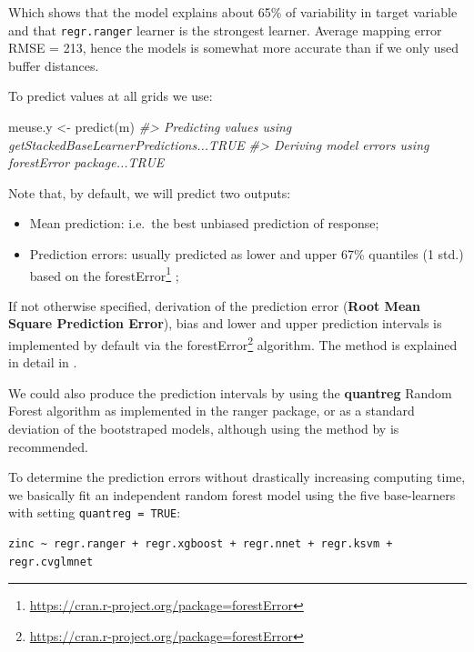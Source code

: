 \documentclass[
  graybox,natbib,nospthms]{svmono}
\newenvironment{Shaded}{\begin{snugshade}}{\end{snugshade}}
\newcommand{\CommentTok}[1]{\textcolor[rgb]{0.37,0.37,0.37}{\textit{#1}}}
\newcommand{\FunctionTok}[1]{\textcolor[rgb]{0,0,0}{#1}}
\newcommand{\NormalTok}[1]{#1}
\newcommand{\OtherTok}[1]{\textcolor[rgb]{0.37,0.37,0.37}{#1}}
\providecommand{\tightlist}{%
  \setlength{\itemsep}{0pt}\setlength{\parskip}{0pt}}
\providecommand{\tightlist}{\setlength{\itemsep}{0pt}\setlength{\parskip}{0pt}}
\renewcommand{\href}[2]{#2 (\url{#1})}
\renewcommand{\href}[2]{#2\footnote{\url{#1}}}
\begin{document}
Which shows that the model explains about 65\% of variability in target variable
and that \texttt{regr.ranger} learner \citep{wright2017ranger} is the strongest learner. Average
mapping error RMSE = 213, hence the models is somewhat more accurate than if we
only used buffer distances.

To predict values at all grids we use:

\begin{Shaded}
\begin{Highlighting}[]
\NormalTok{meuse.y }\OtherTok{\textless{}{-}} \FunctionTok{predict}\NormalTok{(m)}
\CommentTok{\#\textgreater{} Predicting values using \textquotesingle{}getStackedBaseLearnerPredictions\textquotesingle{}...TRUE}
\CommentTok{\#\textgreater{} Deriving model errors using forestError package...TRUE}
\end{Highlighting}
\end{Shaded}

Note that, by default, we will predict two outputs:

\begin{itemize}
\tightlist
\item
  Mean prediction: i.e.~the best unbiased prediction of response;\\
\item
  Prediction errors: usually predicted as lower and upper 67\% quantiles (1 std.) based on the \href{https://cran.r-project.org/package=forestError}{forestError} \citep{lu2021unified};
\end{itemize}

If not otherwise specified, derivation of the prediction error (\textbf{Root Mean Square
Prediction Error}), bias and lower and upper prediction intervals is implemented
by default via the \href{https://cran.r-project.org/package=forestError}{forestError}
algorithm. The method is explained in detail in \citet{lu2021unified}.

We could also produce the prediction intervals by using the \textbf{quantreg} Random Forest
algorithm \citep{meinshausen2006quantile} as implemented in the ranger package, or as
a standard deviation of the bootstraped models, although using the method by \citet{lu2021unified} is recommended.

To determine the prediction errors without drastically increasing computing time,
we basically fit an independent random forest model using the five base-learners
with setting \texttt{quantreg\ =\ TRUE}:

\begin{verbatim}
zinc ~ regr.ranger + regr.xgboost + regr.nnet + regr.ksvm + regr.cvglmnet
\end{verbatim}
\end{document}

